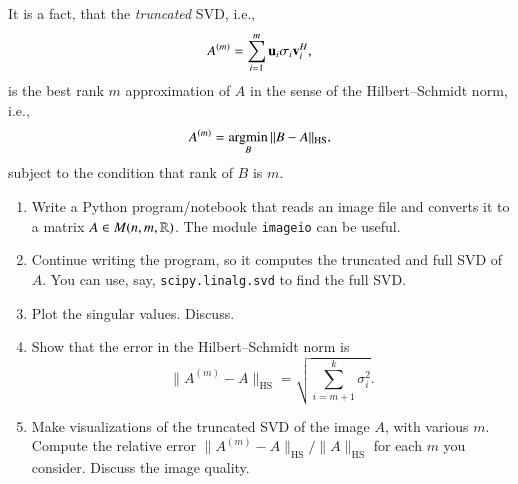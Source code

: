 \documentclass[12pt]{report}
\newenvironment{solution}%
        {%
            \ifthenelse{\isundefined{\showsolutions}}%
                    {\expandafter\comment}%
                    {\begin{mySolution}{}{}}%
                    }%
         {%
            \ifthenelse{\isundefined{\showsolutions}}%
                    {\expandafter\endcomment}%
                    {\end{mySolution}}%
          }
\begin{document}

It is a fact, that the \emph{truncated} SVD, i.e.,
\begin{equation}
       A^{(m)} = \sum_{i=1}^m \mathbf{u}_i \sigma_i \mathbf{v}_i^H,
\end{equation}
is the best rank $m$ approximation of $A$ in the sense of the Hilbert--Schmidt norm, i.e.,
\begin{equation}
    A^{(m)} = \operatornamewithlimits{arg min}_{B}\| B - A\|_{\text{HS}},
\end{equation}
subject to the condition that rank of $B$ is $m$.

\begin{enumerate}[resume]
\item Write a Python program/notebook that reads an image file and converts it to a matrix $A \in M(n,m,\mathbb{R})$. The module \texttt{imageio} can be useful.
\item Continue writing the program, so it computes the truncated and full SVD of $A$. 
You can use, say, \texttt{scipy.linalg.svd} to find the full SVD.
\item Plot the singular values. Discuss.
\item Show that the error in the Hilbert--Schmidt norm is
\begin{equation}
    \| A^{(m)} - A\|_\text{HS} = \sqrt{\sum_{i={m+1}}^k \sigma_i^2}.     
\end{equation}
\item Make visualizations of the truncated SVD of the image $A$, with various $m$. Compute the relative error $\| A^{(m)} - A\|_\text{HS} / \|A\|_\text{HS}$ for each $m$ you consider. Discuss the image quality.
\end{enumerate}
\end{document}
